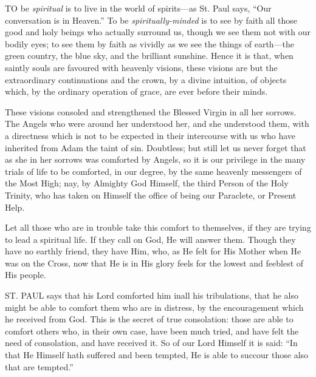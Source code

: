 

TO
be \emph{spiritual} is to live in the world of spirits—as St. Paul
says, ``Our conversation is in Heaven.'' To be \emph{spiritually-minded}
is to see by faith all those good and holy beings who actually surround
us, though we see them not with our bodily eyes; to see them by faith as
vividly as we see the things of earth—the green country, the blue sky,
and the brilliant sunshine. Hence it is that, when saintly souls are
favoured with heavenly visions, these visions are but the extraordinary
continuations and the crown, by a divine intuition, of objects which, by
the ordinary operation of grace, are ever before their minds.

These visions consoled and
strengthened the Blessed Virgin in all her sorrows. The Angels who were
around her understood her, and she understood them, with a directness
which is not to be expected in their intercourse with us who have
inherited from Adam the taint of sin. Doubtless; but still let us never
forget that as she in her sorrows was comforted by Angels, so it is
our privilege in the many trials of life to be comforted, in our degree,
by the same heavenly messengers of the Most High; nay, by Almighty God
Himself, the third Person of the Holy Trinity, who has taken on Himself
the office of being our Paraclete, or Present Help.

Let all those who are in trouble
take this comfort to themselves, if they are trying to lead a spiritual
life. If they call on God, He will answer them. Though they have no
earthly friend, they have Him, who, as He felt for His Mother when He
was on the Cross, now that He is in His glory feels for the lowest and
feeblest of His people.



ST.
PAUL
says that his Lord comforted him in\emph{}all his tribulations, that he
also might be able to comfort them who are in distress, by the
encouragement which he received from God. This is the secret of true
consolation: those are able to comfort others who, in their own case,
have been much tried, and have felt the need of consolation, and have
received it. So of our Lord Himself it is said: ``In that He Himself hath
suffered and been tempted, He is able to succour those also that are
tempted.''

